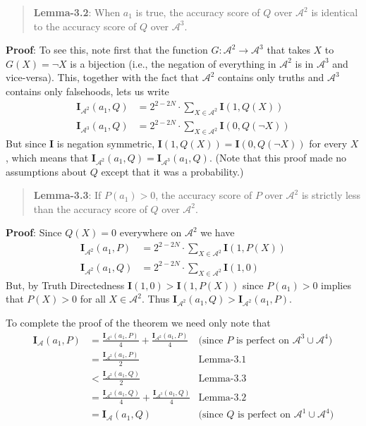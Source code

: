 \begin{quote}

\textbf{Lemma-3.2}: When $a_1$ is true, the accuracy score of $Q$ over $\mathscr{A}^2$ is identical to the accuracy score of $Q$ over $\mathscr{A}^3$.
\end{quote}
\textbf{Proof}: To see this, note first that the function $G: \mathscr{A}^2 \rightarrow \mathscr{A}^3$ that takes $X$ to $G(X) = \neg X$ is a bijection (i.e., the negation of everything in $\mathscr{A}^2$ is in $\mathscr{A}^3$ and vice-versa). This, together with the fact that $\mathscr{A}^2$ contains only truths and $\mathscr{A}^3$ contains only falsehoods, lets us write
\begin{align*}
\mathbf{I}_{\mathscr{A}^2}(a_1, Q) &= 2^{2-2N} \cdot \sum_{X \in \mathscr{A}^2} \mathbf{I}(1, Q(X)) \\
\mathbf{I}_{\mathscr{A}^3}(a_1, Q) &= 2^{2-2N} \cdot \sum_{X \in \mathscr{A}^2} \mathbf{I}(0, Q(\neg X))
\end{align*}
But since \textbf{I} is negation symmetric, $\mathbf{I}(1, Q(X)) = \mathbf{I}(0, Q(\neg X))$ for every $X$, which means that $\mathbf{I}_{\mathscr{A}^2}(a_1, Q) = \mathbf{I}_{\mathscr{A}^3}(a_1, Q)$. (Note that this proof made no assumptions about $Q$ except that it was a probability.)

\begin{quote}

\textbf{Lemma-3.3}: If $P(a_1) > 0$, the accuracy score of $P$ over $\mathscr{A}^2$ is strictly less than the accuracy score of $Q$ over $\mathscr{A}^2$.
\end{quote}
\textbf{Proof}: Since $Q(X) = 0$ everywhere on $\mathscr{A}^2$ we have
\begin{align*}
\mathbf{I}_{\mathscr{A}^2}(a_1, P) &= 2^{2-2N} \cdot \sum_{X \in \mathscr{A}^2} \mathbf{I}(1, P(X)) \\
\mathbf{I}_{\mathscr{A}^2}(a_1, Q) &= 2^{2-2N} \cdot \sum_{X \in \mathscr{A}^2} \mathbf{I}(1, 0) 
\end{align*}
But, by Truth Directedness $\mathbf{I}(1, 0) > \mathbf{I}(1, P(X))$ since $P(a_1) > 0$ implies that $P(X) > 0$ for all $X \in \mathscr{A}^2$. Thus $\mathbf{I}_{\mathscr{A}^2}(a_1, Q) > \mathbf{I}_{\mathscr{A}^2}(a_1, P)$.

\bigskip

To complete the proof of the theorem we need only note that
\begin{align*}
\mathbf{I}_{\mathscr{A}}(a_1, P) &= \frac{\mathbf{I}_{\mathscr{A}^1}(a_1, P)}{4} + \frac{\mathbf{I}_{\mathscr{A}^2}(a_1, P)}{4} &\text{(since }P\text{ is perfect on }\mathscr{A}^3 \cup \mathscr{A}^4) \\
&= \frac{\mathbf{I}_{\mathscr{A}^2}(a_1, P)}{2} &\text{Lemma-3.1} \\
&< \frac{\mathbf{I}_{\mathscr{A}^2}(a_1, Q)}{2} &\text{Lemma-3.3} \\
&= \frac{\mathbf{I}_{\mathscr{A}^2}(a_1, Q)}{4} + \frac{\mathbf{I}_{\mathscr{A}^3}(a_1, Q)}{4} &\text{Lemma-3.2} \\
&= \mathbf{I}_{\mathscr{A}}(a_1, Q) &\text{(since }Q\text{ is perfect on }\mathscr{A}^1 \cup \mathscr{A}^4)
\end{align*}

%